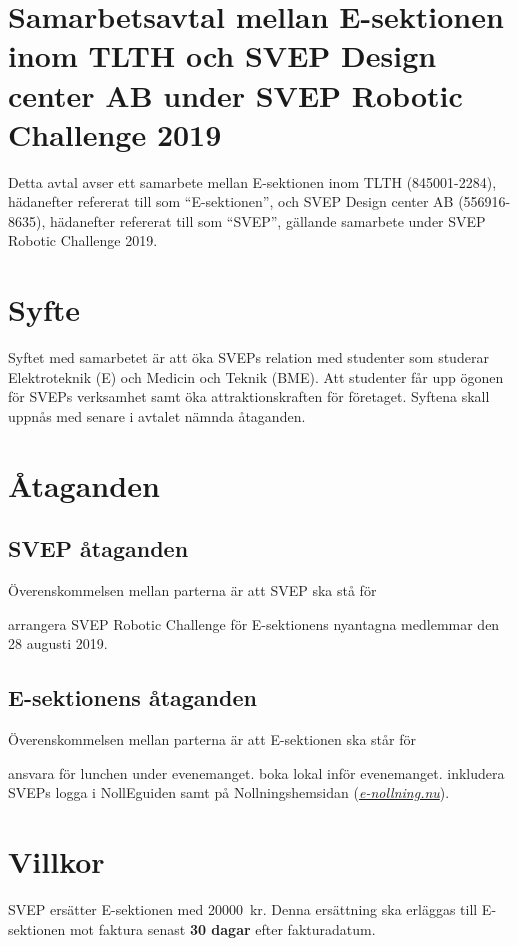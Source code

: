 \documentclass[10pt]{article}
\def\year{2019}
\def\doctitle{Samarbetsavtal mellan E-sektionen inom TLTH och SVEP Design center AB under SVEP Robotic Challenge {\year}}
\begin{document}
        \section*{\doctitle}
        Detta avtal avser ett samarbete mellan E-sektionen inom TLTH (845001-2284), hädanefter refererat till som “E-sektionen”, och SVEP Design center AB (556916-8635), hädanefter refererat till som “SVEP”, gällande samarbete under SVEP Robotic Challenge {\year}.\\
        \section{Syfte}
        Syftet med samarbetet är att öka SVEPs relation med studenter som studerar Elektroteknik (E) och Medicin och Teknik (BME). Att studenter får upp ögonen för SVEPs verksamhet samt öka attraktionskraften för företaget. Syftena skall uppnås med senare i avtalet nämnda åtaganden.
        \section{Åtaganden}
        \subsection{SVEP åtaganden}
        Överenskommelsen mellan parterna är att SVEP ska stå för
        \begin{attsatser}
            \att arrangera SVEP Robotic Challenge för E-sektionens nyantagna medlemmar den 28 augusti 2019.
        \end{attsatser}

        \subsection{E-sektionens åtaganden}
        Överenskommelsen mellan parterna är att E-sektionen ska står för
        \begin{attsatser}
            \att ansvara för lunchen under evenemanget.  
            \att boka lokal inför evenemanget.  
            \att inkludera SVEPs logga i NollEguiden samt på Nollningshemsidan (\href{https://e-nollning.nu/}{\textit{e-nollning.nu}}).      
        \end{attsatser}
      
        \section{Villkor}
        SVEP ersätter E-sektionen med \SI{20000}{kr}. Denna ersättning ska erläggas till E-sektionen mot faktura senast \textbf{30 dagar} efter fakturadatum.
        \newline
\end{document}
